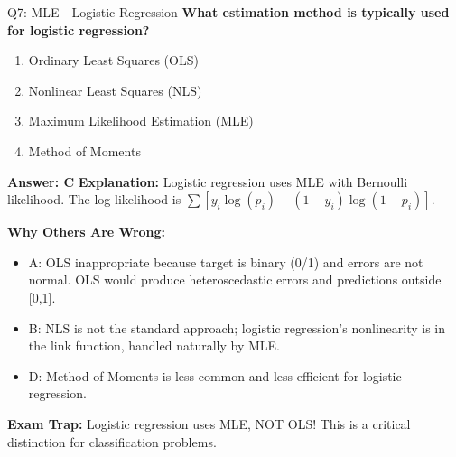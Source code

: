\documentclass[8pt]{beamer}
\begin{document}
	\begin{frame}{Q7: MLE - Logistic Regression}
		\fontsize{6.5}{7.5}\selectfont
		\textbf{What estimation method is typically used for logistic regression?}
		
		\begin{enumerate}
			\item Ordinary Least Squares (OLS)
			\item Nonlinear Least Squares (NLS)
			\item Maximum Likelihood Estimation (MLE)
			\item Method of Moments
		\end{enumerate}
		
		\vspace{0.05cm}
		\textcolor{myblue}{\textbf{Answer: C}}
		\vspace{0.05cm}
		\textcolor{myblue}{\textbf{Explanation:}} Logistic regression uses MLE with Bernoulli likelihood. The log-likelihood is $\sum [y_i \log(p_i) + (1-y_i)\log(1-p_i)]$.
		
		\vspace{0.05cm}
		\textcolor{myred}{\textbf{Why Others Are Wrong:}}
		\begin{itemize}
			\item \textcolor{myred}{A:} OLS inappropriate because target is binary (0/1) and errors are not normal. OLS would produce heteroscedastic errors and predictions outside [0,1].
			\item \textcolor{myred}{B:} NLS is not the standard approach; logistic regression's nonlinearity is in the link function, handled naturally by MLE.
			\item \textcolor{myred}{D:} Method of Moments is less common and less efficient for logistic regression.
		\end{itemize}
		
		\textcolor{myred}{\textbf{Exam Trap:}} Logistic regression uses \textcolor{myblue}{MLE}, NOT OLS! This is a critical distinction for classification problems.
	\end{frame}
	
\end{document}
